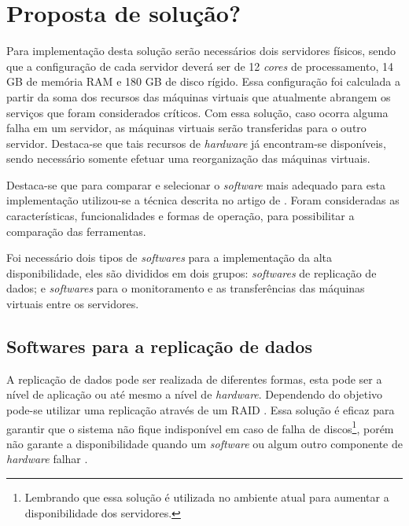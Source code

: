 \section{Proposta de solução?}
\label{section:propostasolucao}

Para implementação desta solução serão necessários dois servidores físicos, sendo que a configuração de cada servidor deverá ser de 
12 \textit{cores} de processamento, 14 GB de memória \ac{RAM} e 180 GB de disco rígido. Essa configuração foi calculada a partir da soma dos 
recursos das máquinas virtuais que atualmente abrangem os serviços que foram considerados críticos. Com essa solução, caso ocorra alguma falha 
em um servidor, as máquinas virtuais serão transferidas para o outro servidor. Destaca-se que tais recursos de \textit{hardware} já 
encontram-se disponíveis, sendo necessário somente efetuar uma reorganização das máquinas virtuais.

Destaca-se que para comparar e selecionar o \textit{software} mais adequado para esta implementação utilizou-se a técnica descrita no artigo 
de \cite{thome2013}. Foram consideradas as características, funcionalidades e formas de operação, para possibilitar a comparação das ferramentas.

Foi necessário dois tipos de \textit{softwares} para a implementação da alta disponibilidade, eles são divididos em dois grupos: 
\textit{softwares} de replicação de dados; e \textit{softwares} para o monitoramento e as transferências das máquinas virtuais entre os servidores.

\subsection{Softwares para a replicação de dados}
\label{section:toolrepl}

A replicação de dados pode ser realizada de diferentes formas, esta pode ser a nível de aplicação ou até mesmo a nível de \textit{hardware}.
Dependendo do objetivo pode-se utilizar uma replicação através de um \ac{RAID} \cite{tanenbaum2009sistemas}. Essa solução é eficaz para garantir 
que o sistema não fique indisponível em caso de falha de discos\footnote[1]{Lembrando que essa solução é utilizada no ambiente atual para 
aumentar a disponibilidade dos servidores.}, porém não garante a disponibilidade quando um \textit{software} ou algum outro componente de 
\textit{hardware} falhar \cite{zaminhani2008}.

